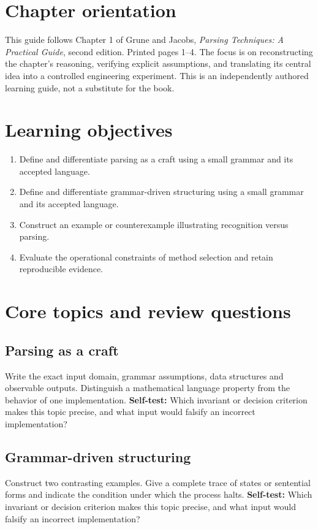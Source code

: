 \documentclass[11pt,letterpaper]{article}
\begin{document}
\makedoctitle\makedocsummary
\tableofcontents\clearpage
\section{Chapter orientation}
This guide follows Chapter 1 of Grune and Jacobs, \emph{Parsing Techniques: A Practical Guide}, second edition. Printed pages 1--4. The focus is on reconstructing the chapter's reasoning, verifying explicit assumptions, and translating its central idea into a controlled engineering experiment. This is an independently authored learning guide, not a substitute for the book.
\section{Learning objectives}
\begin{enumerate}
\item Define and differentiate parsing as a craft using a small grammar and its accepted language.
\item Define and differentiate grammar-driven structuring using a small grammar and its accepted language.
\item Construct an example or counterexample illustrating recognition versus parsing.
\item Evaluate the operational constraints of method selection and retain reproducible evidence.
\end{enumerate}
\section{Core topics and review questions}
\subsection{Parsing as a craft}
Write the exact input domain, grammar assumptions, data structures and observable outputs. Distinguish a mathematical language property from the behavior of one implementation.
\textbf{Self-test:} Which invariant or decision criterion makes this topic precise, and what input would falsify an incorrect implementation?
\subsection{Grammar-driven structuring}
Construct two contrasting examples. Give a complete trace of states or sentential forms and indicate the condition under which the process halts.
\textbf{Self-test:} Which invariant or decision criterion makes this topic precise, and what input would falsify an incorrect implementation?
\end{document}
